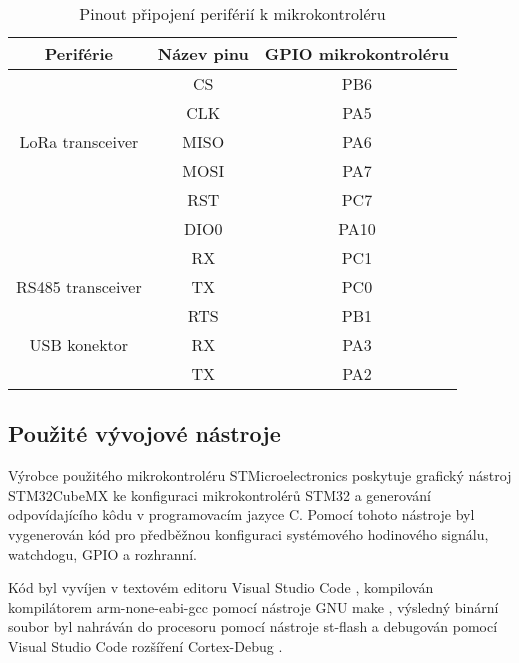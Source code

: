 \begin{table}[!h]
    \centering
    \begin{ctucolortab}
            \begin{tabular}{ |c|c|c| }
     \hline

     Periférie          & Název pinu & GPIO mikrokontroléru           \\ \hline \hline

                        & CS    &  PB6             \\
                        & CLK   &  PA5        \\
    LoRa transceiver    & MISO  &  PA6     \\
                        & MOSI  &  PA7        \\
                        & RST   & PC7          \\
                        & DIO0  & PA10         \\
                        \hline

                        & RX  &   PC1            \\
    RS485 transceiver   & TX  &   PC0       \\
                        & RTS  &  PB1      \\     \hline

    USB konektor        & RX    & PA3    \\
                        & TX    & PA2   \\          \hline

    \end{tabular}
    \end{ctucolortab}
    \caption{Pinout připojení periférií k mikrokontroléru}
    \label{table:Pinout připojení periférií k mikrokontroléru}
\end{table}


\subsection{Použité vývojové nástroje}
Výrobce použitého mikrokontroléru STMicroelectronics poskytuje grafický nástroj STM32CubeMX \cite{stm32cubemx} ke konfiguraci mikrokontrolérů STM32 a generování odpovídajícího kôdu v programovacím jazyce C.
Pomocí tohoto nástroje byl vygenerován kód pro předběžnou konfiguraci systémového hodinového signálu, watchdogu, GPIO a rozhranní.

Kód byl vyvíjen v textovém editoru Visual Studio Code \cite{vscode}, kompilován kompilátorem arm-none-eabi-gcc \cite{arm-none-eabi-gcc} pomocí nástroje GNU make \cite{makefile}, výsledný binární soubor byl nahráván do procesoru pomocí nástroje st-flash \cite{st-flash} a debugován pomocí Visual Studio Code rozšíření Cortex-Debug \cite{cortex-debug}.


